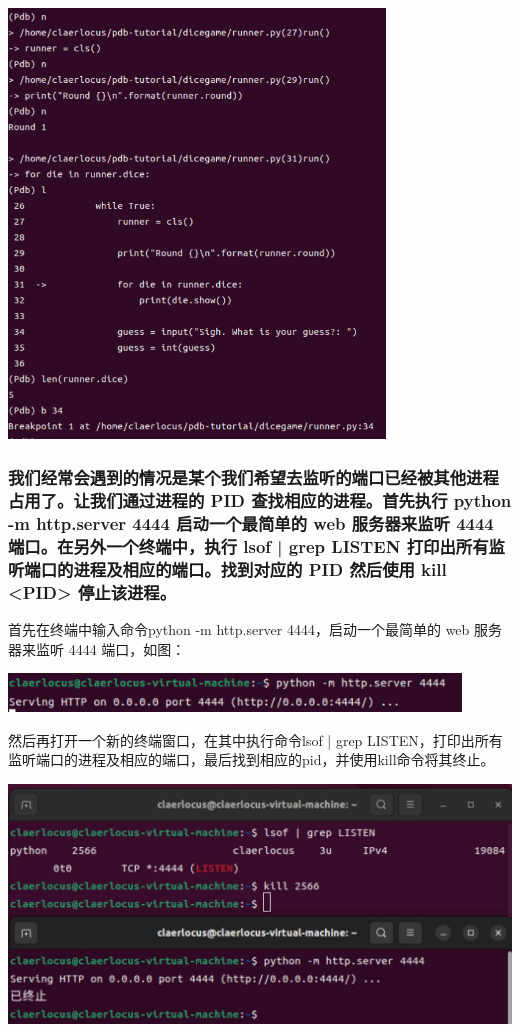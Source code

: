 \documentclass[UTF8,a4paper]{ctexart}
\begin{document}
\begin{sloppypar}
	\includegraphics[width = 10cm]{9}
	
	\subsubsection{我们经常会遇到的情况是某个我们希望去监听的端口已经被其他进程占用了。让我们通过进程的 PID 查找相应的进程。首先执行 python -m http.server 4444 启动一个最简单的 web 服务器来监听 4444 端口。在另外一个终端中，执行 lsof | grep LISTEN 打印出所有监听端口的进程及相应的端口。找到对应的 PID 然后使用 kill <PID> 停止该进程。}
	首先在终端中输入命令python -m http.server 4444，启动一个最简单的 web 服务器来监听 4444 端口，如图：

	\includegraphics[width = 12cm]{10}

	然后再打开一个新的终端窗口，在其中执行命令lsof | grep LISTEN，打印出所有监听端口的进程及相应的端口，最后找到相应的pid，并使用kill命令将其终止。

	\includegraphics[width = 14cm]{11}
	

\end{sloppypar}
\end{document}
